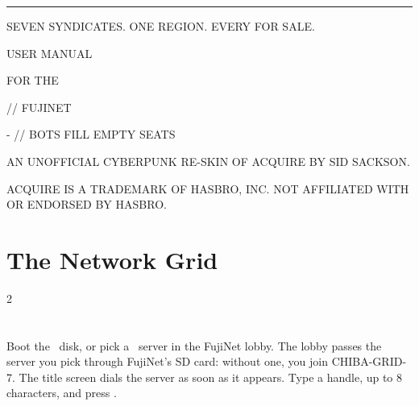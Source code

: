 \documentclass[12pt,letterpaper]{article}
\begin{document}
\begin{titlepage}
\machine
\vspace*{1.6in}
{\color{amber}\rule{\linewidth}{2pt}}\par\vspace{14pt}
{\fontsize{44}{48}\selectfont \game\par}\vspace{10pt}
{\fontsize{12}{16}\selectfont\color{steel} SEVEN SYNDICATES. ONE REGION. EVERY \MakeUppercase{} FOR SALE.\par}
\vspace{14pt}{\color{amber}\rule{\linewidth}{2pt}}\par
\vspace{0.35in}
{\fontsize{24}{30}\selectfont USER MANUAL\par}\vspace{4pt}
{\fontsize{14}{18}\selectfont\color{amber} FOR THE \MakeUppercase{\PlatformLong}\par}
\vspace{0.4in}
{\fontsize{12}{16}\selectfont \PlatformMachines \quad // \quad FUJINET\par
{}- \MakeUppercase{} \quad // \quad BOTS FILL EMPTY SEATS\par}
\vfill
{\fontsize{8.5}{11}\selectfont\color{steel}
AN UNOFFICIAL CYBERPUNK RE-SKIN OF ACQUIRE BY SID SACKSON.\par
ACQUIRE IS A TRADEMARK OF HASBRO, INC. NOT AFFILIATED WITH OR ENDORSED BY HASBRO.\par}
\end{titlepage}

\renewcommand{\secstatus}{THE SETTING \quad // \quad THE OBJECT \quad // \quad THE END}
\chapter{The Network Grid}
\begin{multicols}{2}
\end{multicols}

\renewcommand{\secstatus}{REGION \quad // \quad STATUS \quad // \quad HANDLE}
\chapter{}
Boot the \game\ disk, or pick a \game\ server in the FujiNet lobby. The lobby passes the server you pick through FujiNet's SD card: without one, you join CHIBA-GRID-7. The title screen dials the server as
soon as it appears. Type a handle, up to 8 characters, and press .
\end{document}
